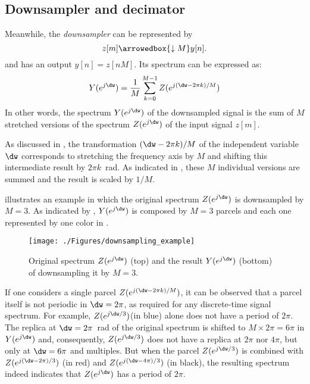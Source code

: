 \subsection{Downsampler and decimator}

Meanwhile, the \emph{downsampler} can be represented by
\[
z[m] \arrowedbox{\downarrow{M}} y[n].
\] 
and has an output $y[n] = z[nM]$. Its spectrum can be expressed as:
\begin{equation}
Y(e^{j\dw}) = \frac{1}{M} \sum_{k=0}^{M-1} Z(e^{j(\dw-2 \pi k)/M})
\label{eq:downsamplerSpectrum}
\end{equation}
In other words, the spectrum $Y(e^{j\dw})$ of the downsampled signal is the sum of $M$ stretched versions of the spectrum $Z(e^{j\dw})$ of the input signal $z[m]$. 

As discussed in , the transformation $(\dw-2 \pi k)/M$ of the independent  
variable $\dw$ corresponds to stretching the frequency axis by $M$ and shifting this intermediate result by $2\pi k$~rad. As indicated in , these $M$ individual versions are summed and the result is scaled by $1/M$.

 illustrates an example in which the original spectrum $Z(e^{j\dw})$ is downsampled by $M=3$. As indicated by , $Y(e^{j\dw})$ is composed by $M=3$ parcels and each one represented by one color in . 

\begin{figure}
\texttt{[image: ./Figures/downsampling\_example]}
\caption{Original spectrum $Z(e^{j\dw})$ (top) and the result $Y(e^{j\dw})$ (bottom) of downsampling it by $M=3$.\label{fig:downsampling_example}}
\end{figure}

If one considers a single parcel $Z(e^{j(\dw-2 \pi k)/M})$, it can be observed that a parcel itself is not periodic in $\dw=2\pi$, as required for any discrete-time signal spectrum. For example, $Z(e^{j\dw/3})$(in blue) alone does not have a period of $2\pi$.  The replica at $\dw=2\pi$~rad of the original spectrum is shifted to $M \times 2\pi = 6 \pi$ in $Y(e^{j\dw})$ and, consequently, $Z(e^{j\dw/3})$ does not have a replica at $2 \pi$ nor $4 \pi$, but only at $\dw=6 \pi$ and multiples.
But when the parcel $Z(e^{j\dw/3})$ is combined with $Z(e^{j(\dw-2 \pi)/3})$ (in red) and $Z(e^{j(\dw-4 \pi)/3})$ (in black), the resulting spectrum indeed indicates that $Z(e^{j\dw})$ has a period of $2 \pi$.


